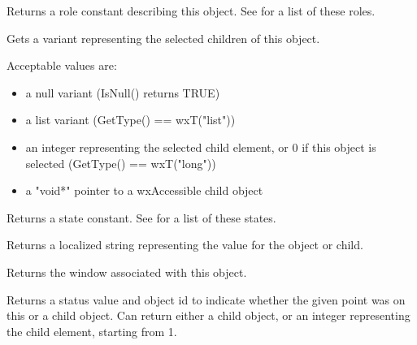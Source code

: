 Returns a role constant describing this object. See  for a list
of these roles.

\label{wxaccessiblegetselections}


Gets a variant representing the selected children
of this object.

Acceptable values are:

\begin{itemize}
\item  a null variant (IsNull() returns TRUE)
\item  a list variant (GetType() == wxT("list"))
\item  an integer representing the selected child element,
or 0 if this object is selected (GetType() == wxT("long"))
\item a "void*" pointer to a wxAccessible child object
\end{itemize}

\label{wxaccessiblegetstate}


Returns a state constant. See  for a list
of these states.

\label{wxaccessiblegetvalue}


Returns a localized string representing the value for the object
or child.

\label{wxaccessiblegetwindow}


Returns the window associated with this object.

\label{wxaccessiblehittest}


Returns a status value and object id to indicate whether the given point was on this or
a child object. Can return either a child object, or an integer
representing the child element, starting from 1.


